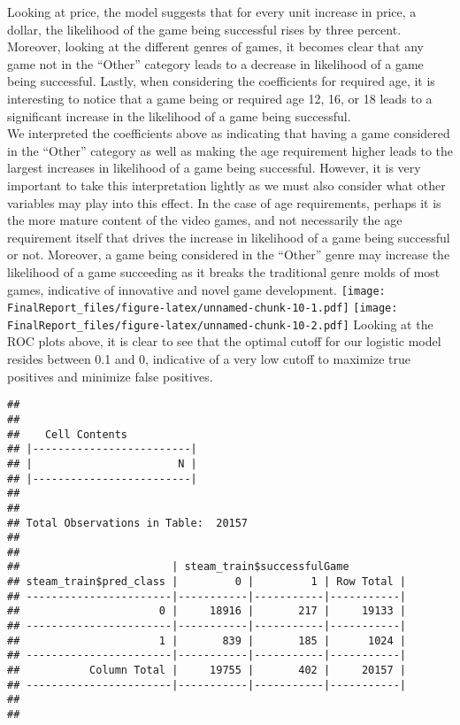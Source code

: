 \documentclass[]{article}
\begin{document}
Looking at price, the model suggests that for every unit increase in
price, a dollar, the likelihood of the game being successful rises by
three percent. Moreover, looking at the different genres of games, it
becomes clear that any game not in the ``Other'' category leads to a
decrease in likelihood of a game being successful. Lastly, when
considering the coefficients for required age, it is interesting to
notice that a game being or required age 12, 16, or 18 leads to a
significant increase in the likelihood of a game being successful.\\
We interpreted the coefficients above as indicating that having a game
considered in the ``Other'' category as well as making the age
requirement higher leads to the largest increases in likelihood of a
game being successful. However, it is very important to take this
interpretation lightly as we must also consider what other variables may
play into this effect. In the case of age requirements, perhaps it is
the more mature content of the video games, and not necessarily the age
requirement itself that drives the increase in likelihood of a game
being successful or not. Moreover, a game being considered in the
``Other'' genre may increase the likelihood of a game succeeding as it
breaks the traditional genre molds of most games, indicative of
innovative and novel game development.
\texttt{[image: FinalReport\_files/figure-latex/unnamed-chunk-10-1.pdf]}
\texttt{[image: FinalReport\_files/figure-latex/unnamed-chunk-10-2.pdf]}
Looking at the ROC plots above, it is clear to see that the optimal
cutoff for our logistic model resides between 0.1 and 0, indicative of a
very low cutoff to maximize true positives and minimize false positives.

\begin{verbatim}
## 
##  
##    Cell Contents
## |-------------------------|
## |                       N |
## |-------------------------|
## 
##  
## Total Observations in Table:  20157 
## 
##  
##                        | steam_train$successfulGame 
## steam_train$pred_class |         0 |         1 | Row Total | 
## -----------------------|-----------|-----------|-----------|
##                      0 |     18916 |       217 |     19133 | 
## -----------------------|-----------|-----------|-----------|
##                      1 |       839 |       185 |      1024 | 
## -----------------------|-----------|-----------|-----------|
##           Column Total |     19755 |       402 |     20157 | 
## -----------------------|-----------|-----------|-----------|
## 
## 
\end{verbatim}
\end{document}
